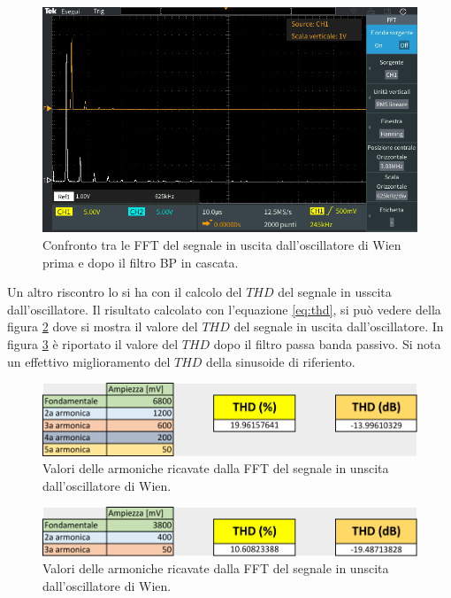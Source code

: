 \documentclass[titlepage]{report}
\begin{document}
	\begin{figure}[H]
		\centering
		\includegraphics[scale=0.5]{Immagini/fft_osc+bp210k.PNG}
		\caption{Confronto tra le FFT del segnale in uscita dall'oscillatore di Wien prima e dopo il filtro BP in cascata.}
		\label{fig:FFTwien+BP}
	\end{figure}

	Un altro riscontro lo si ha con il calcolo del $THD$ del segnale in usscita dall'oscillatore. Il risultato calcolato con l'equazione \ref{eq:thd}, si può vedere della figura \ref{fig:ThdWien} dove si mostra il valore del $THD$ del segnale in uscita dall'oscillatore. In figura \ref{fig:ThdWien+lp} è riportato il valore del $THD$ dopo il filtro passa banda passivo. Si nota un effettivo miglioramento del $THD$ della sinusoide di riferiento.

	\begin{figure}[H]
		\centering
		\includegraphics[scale=0.5]{Immagini/thd_osc.pdf}
		\caption{Valori delle armoniche ricavate dalla FFT del segnale in unscita dall'oscillatore di Wien.}
		\label{fig:ThdWien}
	\end{figure}
	 
	\begin{figure}[H]
		\centering
		\includegraphics[scale=0.5]{Immagini/thd_osc+bp.pdf}
		\caption{Valori delle armoniche ricavate dalla FFT del segnale in unscita dall'oscillatore di Wien.}
		\label{fig:ThdWien+lp}
	\end{figure}
\end{document}
